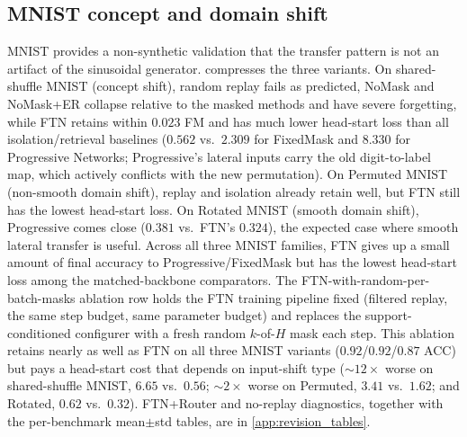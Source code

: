 \documentclass[11pt]{article}
\begin{document}
\subsection{MNIST concept and domain shift}\label{sec:results_mnist}
MNIST provides a non-synthetic validation that the transfer pattern is not an artifact of the sinusoidal generator.  compresses the three variants. On shared-shuffle MNIST (concept shift), random replay fails as predicted, NoMask and NoMask+ER collapse relative to the masked methods and have severe forgetting, while FTN retains within $0.023$ FM and has much lower head-start loss than all isolation/retrieval baselines ($0.562$ vs.\ $2.309$ for FixedMask and $8.330$ for Progressive Networks; Progressive's lateral inputs carry the old digit-to-label map, which actively conflicts with the new permutation). On Permuted MNIST (non-smooth domain shift), replay and isolation already retain well, but FTN still has the lowest head-start loss. On Rotated MNIST (smooth domain shift), Progressive comes close ($0.381$ vs.\ FTN's $0.324$), the expected case where smooth lateral transfer is useful. Across all three MNIST families, FTN gives up a small amount of final accuracy to Progressive/FixedMask but has the lowest head-start loss among the matched-backbone comparators. The FTN-with-random-per-batch-masks ablation row holds the FTN training pipeline fixed (filtered replay, the same step budget, same parameter budget) and replaces the support-conditioned configurer with a fresh random $k$-of-$H$ mask each step. This ablation retains nearly as well as FTN on all three MNIST variants ($0.92$/$0.92$/$0.87$ ACC) but pays a head-start cost that depends on input-shift type ($\sim\!12\times$ worse on shared-shuffle MNIST, $6.65$ vs.\ $0.56$; $\sim\!2\times$ worse on Permuted, $3.41$ vs.\ $1.62$; and Rotated, $0.62$ vs.\ $0.32$). FTN+Router and no-replay diagnostics, together with the per-benchmark mean$\pm$std tables, are in \cref{app:revision_tables}.
\end{document}
